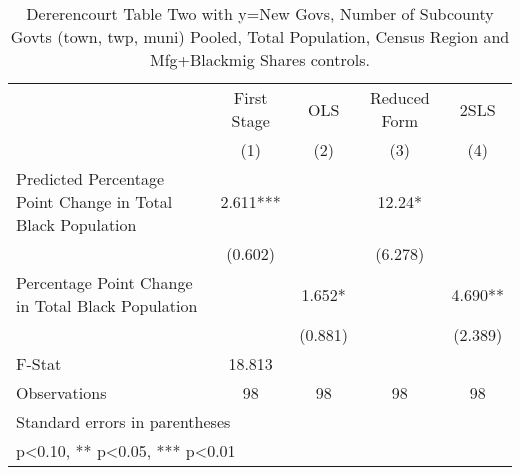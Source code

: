 \begin{table}[htbp]\centering
\def\sym#1{\ifmmode^{#1}\else\(^{#1}\)\fi}
\caption{Dererencourt Table Two with y=New Govs, Number of Subcounty Govts (town, twp, muni)  Pooled, Total Population, Census Region and Mfg+Blackmig Shares controls.}
\begin{tabular}{l*{4}{c}}
\toprule
                    & First Stage   &         OLS   &Reduced Form   &        2SLS   \\
                    &\multicolumn{1}{c}{(1)}   &\multicolumn{1}{c}{(2)}   &\multicolumn{1}{c}{(3)}   &\multicolumn{1}{c}{(4)}   \\
\midrule
Predicted Percentage Point Change in Total Black Population&       2.611***&               &       12.24*  &               \\
                    &     (0.602)   &               &     (6.278)   &               \\
\addlinespace
Percentage Point Change in Total Black Population&               &       1.652*  &               &       4.690** \\
                    &               &     (0.881)   &               &     (2.389)   \\
\midrule
F-Stat              &      18.813   &               &               &               \\
Observations        &          98   &          98   &          98   &          98   \\
\bottomrule
\multicolumn{5}{l}{\footnotesize Standard errors in parentheses}\\
\multicolumn{5}{l}{\footnotesize * p<0.10, ** p<0.05, *** p<0.01}\\
\end{tabular}
\end{table}
